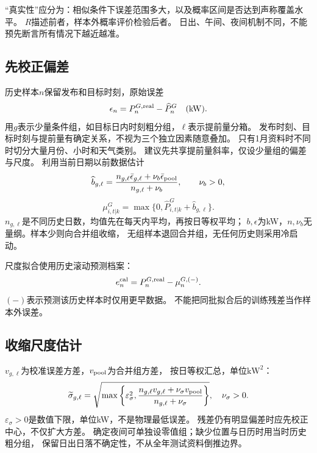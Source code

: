 \documentclass[UTF8,11pt]{ctexart}
\begin{document}
“真实性”应分为：相似条件下误差范围多大，以及概率区间是否达到声称覆盖水平。
$R$描述前者，样本外概率评价检验后者。
日出、午间、夜间机制不同，不能预先断言所有情况下越近越准。

\subsection{先校正偏差}
历史样本$n$保留发布和目标时刻，原始误差
\begin{equation}
 \epsilon_n=P^{G,\rm real}_n-\widehat P^G_n\quad(\mathrm{kW}).
\end{equation}
用$g$表示少量条件组，如目标日内时刻粗分组，$\ell$表示提前量分箱。
发布时刻、目标时刻与提前量有确定关系，不视为三个独立因素随意叠加。
只有1月资料时不同时切分大量月份、小时和天气类别。
建议先共享提前量斜率，仅设少量组的偏差与尺度。
利用当前日期以前数据估计
\begin{equation}
 \widehat b_{g,\ell}
 =\frac{n_{g,\ell}\bar\epsilon_{g,\ell}+\nu_b\bar\epsilon_{\rm pool}}
        {n_{g,\ell}+\nu_b},\qquad \nu_b>0,
\end{equation}
\begin{equation}\label{eq:bias}
 \mu^G_{i,t|k}=\max\{0,\widehat P^G_{i,t|k}+\widehat b_{g,\ell}\}.
\end{equation}
$n_{g,\ell}$是不同历史日数，均值先在每天内平均，再按日等权平均；
$b,\epsilon$为kW，$n,\nu_b$无量纲。样本少则向合并组收缩，
无组样本退回合并组，无任何历史则采用冷启动。

尺度拟合使用历史滚动预测档案：
\begin{equation}\label{eq:residual}
 e_n^{\rm cal}=P^{G,\rm real}_n-\mu_n^{G,(-)}.
\end{equation}
$(-)$表示预测该历史样本时仅用更早数据。
不能把同批拟合后的训练残差当作样本外误差。

\subsection{收缩尺度估计}
$v_{g,\ell}$为校准误差方差，$v_{\rm pool}$为合并组方差，
按日等权汇总，单位$\mathrm{kW}^2$：
\begin{equation}\label{eq:shrink}
 \widetilde\sigma_{g,\ell}=
 \sqrt{\max\left\{\varepsilon_\sigma^2,
 \frac{n_{g,\ell}v_{g,\ell}+\nu_\sigma v_{\rm pool}}
      {n_{g,\ell}+\nu_\sigma}\right\}},\quad \nu_\sigma>0.
\end{equation}
$\varepsilon_\sigma>0$是数值下限，单位kW，不是物理最低误差。
残差仍有明显偏差时应先校正中心，不仅扩大方差。
确定夜间可单独设零值组；缺少位置与日历时用当时历史粗分组，
保留日出日落不确定性，不从全年测试资料倒推边界。
\end{document}
